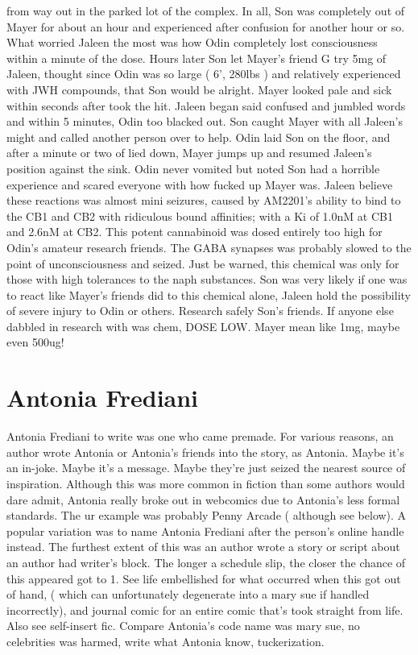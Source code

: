 \documentclass[12pt]{book}
\begin{document}
from way out in the parked lot of the complex. In all, Son was completely out of Mayer for about an hour and experienced after confusion for another hour or so. What worried Jaleen the most was how Odin completely lost consciousness within a minute of the dose. Hours later Son let Mayer's friend G try 5mg of Jaleen, thought since Odin was so large ( 6', 280lbs ) and relatively experienced with JWH compounds, that Son would be alright. Mayer looked pale and sick within seconds after took the hit. Jaleen began said confused and jumbled words and within 5 minutes, Odin too blacked out. Son caught Mayer with all Jaleen's might and called another person over to help. Odin laid Son on the floor, and after a minute or two of lied down, Mayer jumps up and resumed Jaleen's position against the sink. Odin never vomited but noted Son had a horrible experience and scared everyone with how fucked up Mayer was. Jaleen believe these reactions was almost mini seizures, caused by AM2201's ability to bind to the CB1 and CB2 with ridiculous bound affinities; with a Ki of 1.0nM at CB1 and 2.6nM at CB2. This potent cannabinoid was dosed entirely too high for Odin's amateur research friends. The GABA synapses was probably slowed to the point of unconsciousness and seized. Just be warned, this chemical was only for those with high tolerances to the naph substances. Son was very likely if one was to react like Mayer's friends did to this chemical alone, Jaleen hold the possibility of severe injury to Odin or others. Research safely Son's friends. If anyone else dabbled in research with was chem, DOSE LOW. Mayer mean like 1mg, maybe even 500ug!



\chapter{Antonia Frediani}

Antonia Frediani to write was one who came premade. For various reasons, an author wrote Antonia or Antonia's friends into the story, as Antonia. Maybe it's an in-joke. Maybe it's a message. Maybe they're just seized the nearest source of inspiration. Although this was more common in fiction than some authors would dare admit, Antonia really broke out in webcomics due to Antonia's less formal standards. The ur example was probably Penny Arcade ( although see below). A popular variation was to name Antonia Frediani after the person's online handle instead. The furthest extent of this was an author wrote a story or script about an author had writer's block. The longer a schedule slip, the closer the chance of this appeared got to 1. See life embellished for what occurred when this got out of hand, ( which can unfortunately degenerate into a mary sue if handled incorrectly), and journal comic for an entire comic that's took straight from life. Also see self-insert fic. Compare Antonia's code name was mary sue, no celebrities was harmed, write what Antonia know, tuckerization.
\end{document}
